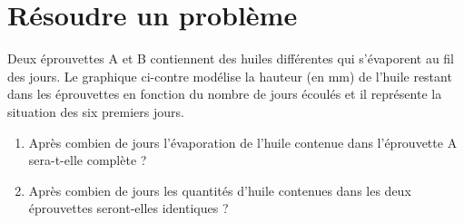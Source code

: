 \documentclass[a4paper, 12pt, parskip=half-]{scrartcl}
\begin{document}
\section*{ Résoudre un problème}
\begin{exercise}[points=4]
    \parbox[c]{.5\linewidth}{Deux éprouvettes A et B contiennent des huiles différentes qui s'évaporent au fil des jours.
        Le graphique ci-contre modélise la hauteur (en mm) de l'huile restant dans les éprouvettes en fonction du nombre de jours écoulés et il représente la situation des six premiers jours.}
    \hfil
    
    \begin{enumerate}
        \item Après combien de jours l'évaporation de l'huile contenue dans l'éprouvette A sera-t-elle complète ?
        \item Après combien de jours les quantités d'huile contenues dans les deux éprouvettes seront-elles identiques ?
    \end{enumerate}
\end{exercise}
\end{document}
